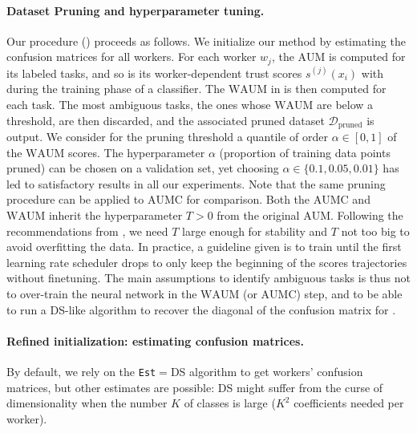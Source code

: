 \paragraph{Dataset Pruning and hyperparameter tuning.} Our procedure () proceeds as follows.
We initialize our method by estimating the confusion matrices for all workers.
For each worker $w_j$, the $\mathrm{AUM}$ is computed for its labeled tasks, and so is its worker-dependent trust scores $s^{(j)}(x_i)$ with  during the training phase of a classifier.
The $\mathrm{WAUM}$ in  is then computed for each task.
The most ambiguous tasks, the ones whose $\mathrm{WAUM}$ are below a threshold, are then discarded, and the associated pruned dataset $\mathcal{D}_{\text{pruned}}$ is output. We consider for the pruning threshold a quantile of order $\alpha\in[0,1]$ of the $\mathrm{WAUM}$ scores.
The hyperparameter $\alpha$ (proportion of training data points pruned) can be chosen on a validation set, yet choosing $\alpha\in\{0.1, 0.05, 0.01\}$ has led to satisfactory results in all our experiments.
Note that the same pruning procedure can be applied to $\mathrm{AUMC}$ for comparison.
Both the $\mathrm{AUMC}$ and $\mathrm{WAUM}$ inherit the hyperparameter $T>0$ from the original $\mathrm{AUM}$.
Following the recommendations from \citet{pleiss_identifying_2020}, we need $T$ large enough for stability and $T$ not too big to avoid overfitting the data.
In practice, a guideline given is to train until the first learning rate scheduler drops to only keep the beginning of the scores trajectories without finetuning.
The main assumptions to identify ambiguous tasks is thus not to over-train the neural network in the $\mathrm{WAUM}$ (or $\mathrm{AUMC}$) step, and to be able to run a DS-like algorithm to recover the diagonal of the confusion matrix for .

\paragraph*{Refined initialization: estimating confusion matrices.}
By default, we rely on the \texttt{Est}$=$DS algorithm to get workers' confusion matrices, but other estimates are possible: DS might suffer from the curse of dimensionality when the number $K$ of classes is large ($K^2$ coefficients needed per worker).

